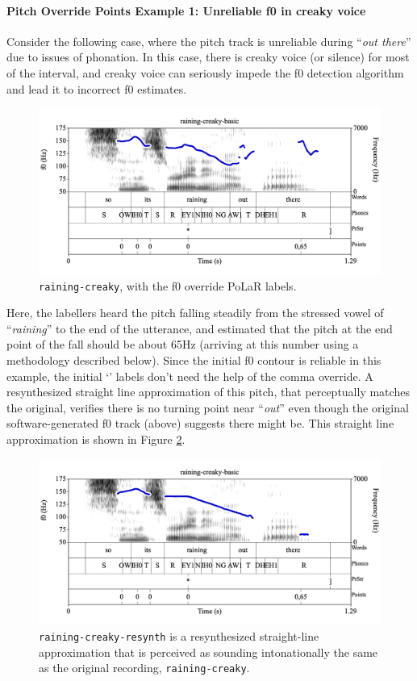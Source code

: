 \documentclass[11pt, twoside]{memoir}
\def\textlabel#1{{\relsize{-.5}\fontspec[Mapping=tex-text]{Roboto Mono}{#1}}}
\def\langtext#1{\textit{#1}}
\begin{document}
\paragraph{Pitch Override Points Example 1: Unreliable f0 in creaky voice\label{pitch-override-points-example-1}}
Consider the following case, where the pitch track is unreliable during “\langtext{out there}” due to issues of phonation. In this case, there is creaky voice (or silence) for most of the interval, and creaky voice can seriously impede the f0 detection algorithm and lead it to incorrect f0 estimates.
\begin{figure}[H]
\centering
\includegraphics[width=.875\linewidth]{Points-raining-creaky-basic-comma.png}
\caption{\texttt{raining-creaky}, with the f0 override PoLaR labels.
\label{fig:raining-creaky Points comma}
}
\end{figure}
Here, the labellers heard the pitch falling steadily from the stressed vowel of “\langtext{raining}” to the end of the utterance, and estimated that the pitch at the end point of the fall should be about 65Hz (arriving at this number using a methodology described below). Since the initial f0 contour is reliable in this example, the initial ‘\textlabel{0}’ labels don’t need the help of the comma override. A resynthesized straight line approximation of this pitch, that perceptually matches the original, verifies there is no turning point near “\langtext{out}” even though the original software-generated f0 track (above) suggests there might be. This straight line approximation is shown in Figure \ref{fig:raining-creaky Points basic resynth}.
\begin{figure}[H]
\centering
\includegraphics[width=.875\linewidth]{Points-raining-creaky-resynth-basic.png}
\caption{\texttt{raining-creaky-resynth} is a resynthesized straight-line approximation that is perceived as sounding intonationally the same as the original recording, \texttt{raining-creaky}.
\label{fig:raining-creaky Points basic resynth}
}
\end{figure}
\end{document}
